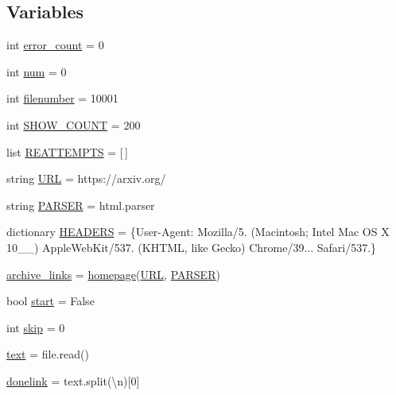 \subsection*{Variables}
\begin{DoxyCompactItemize}
\item 
int \hyperlink{namespacescraper_af659a7bd047bbe1870120786cce2d626}{error\+\_\+count} = 0
\item 
int \hyperlink{namespacescraper_a331841d7f781aa037b4798c8b96fa6d4}{num} = 0
\item 
int \hyperlink{namespacescraper_aea7e8854e09bfb4f0ea3454480b6e48a}{filenumber} = 10001
\item 
int \hyperlink{namespacescraper_a4b0a29417be87040f80007db33c60423}{S\+H\+O\+W\+\_\+\+C\+O\+U\+NT} = 200
\item 
list \hyperlink{namespacescraper_a2e27301d601227a988938abb0f78236f}{R\+E\+A\+T\+T\+E\+M\+P\+TS} = \mbox{[}$\,$\mbox{]}
\item 
string \hyperlink{namespacescraper_a60a59c7182708d1f2fdee75dd2a88e7d}{U\+RL} = \textquotesingle{}https\+://arxiv.\+org/\textquotesingle{}
\item 
string \hyperlink{namespacescraper_a35fba8057dccafa1d2dc0c57018daaaa}{P\+A\+R\+S\+ER} = \textquotesingle{}html.\+parser\textquotesingle{}
\item 
dictionary \hyperlink{namespacescraper_a2b868827f0fdbf8e5deff7fd8866ae2f}{H\+E\+A\+D\+E\+RS} = \{\textquotesingle{}User-\/Agent\textquotesingle{}\+: \textquotesingle{}Mozilla/5. (Macintosh; Intel Mac OS X 10\+\_\+\_) Apple\+Web\+Kit/537. (\+K\+H\+T\+M\+L, like Gecko) Chrome/39... Safari/537.\textquotesingle{}\}
\item 
\hyperlink{namespacescraper_a26e907fd56e5fdee79f84a5e664fd863}{archive\+\_\+links} = \hyperlink{namespacescraper_aeb86f98f931e90255baf4fb49910864e}{homepage}(\hyperlink{namespacescraper_a60a59c7182708d1f2fdee75dd2a88e7d}{U\+RL}, \hyperlink{namespacescraper_a35fba8057dccafa1d2dc0c57018daaaa}{P\+A\+R\+S\+ER})
\item 
bool \hyperlink{namespacescraper_a4aaf6d11bb8b81670a9f26121befb435}{start} = False
\item 
int \hyperlink{namespacescraper_a7716e2d7e7879e1cadb7839b0a1533c7}{skip} = 0
\item 
\hyperlink{namespacescraper_a1e2bdd0d9a1a63195db7a2da89193e40}{text} = file.\+read()
\item 
\hyperlink{namespacescraper_a704a8e4e62c4c51619d753bf4d29849b}{donelink} = text.\+split(\textquotesingle{}\textbackslash{}n\textquotesingle{})\mbox{[}0\mbox{]}

\end{DoxyCompactItemize}
